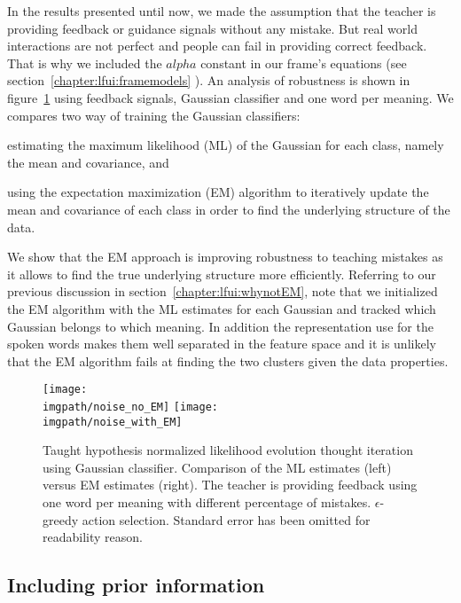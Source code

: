 In the results presented until now, we made the assumption that the teacher is providing feedback or guidance signals without any mistake. But real world interactions are not perfect and people can fail in providing correct feedback. That is why we included the $alpha$ constant in our frame's equations (see section~\ref{chapter:lfui:framemodels}
). An analysis of robustness is shown in figure~\ref{fig:Noise} using feedback signals, Gaussian classifier and one word per meaning. We compares two way of training the Gaussian classifiers: \begin{inparaenum}[a)] \item estimating the maximum likelihood (ML) of the Gaussian for each class, namely the mean and covariance, and \item using the expectation maximization (EM) algorithm to iteratively update the mean and covariance of each class in order to find the underlying structure of the data. \end{inparaenum} 

We show that the EM approach is improving robustness to teaching mistakes as it allows to find the true underlying structure more efficiently. Referring to our previous discussion in section~\ref{chapter:lfui:whynotEM}, note that we initialized the EM algorithm with the ML estimates for each Gaussian and tracked which Gaussian belongs to which meaning. In addition the representation use for the spoken words makes them well separated in the feature space and it is unlikely that the EM algorithm fails at finding the two clusters given the data properties.

\begin{figure}[!ht]
  \centering
  \texttt{[image: \\imgpath/noise\_no\_EM]}
  \texttt{[image: \\imgpath/noise\_with\_EM]}
  \caption{Taught hypothesis normalized likelihood evolution thought iteration using Gaussian classifier. Comparison of the ML estimates (left) versus EM estimates (right). The teacher is providing feedback using one word per meaning with different percentage of mistakes. $\epsilon$-greedy action selection. Standard error has been omitted for readability reason.}
  \label{fig:Noise}
\end{figure}


\subsection{Including prior information}
\label{sec:IncludingPriorInformation}

